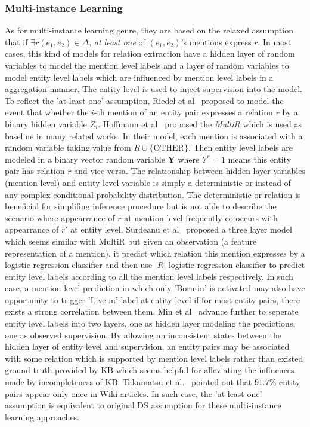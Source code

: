 \documentclass[10pt]{article} %
\theoremstyle{definition}
\theoremstyle{definition}
\begin{document}
\subsubsection{Multi-instance Learning} 
As for multi-instance learning genre, they are based on the relaxed assumption that if $\exists r(e_1, e_2)\in\Delta$, \emph{at least one} of $(e_1, e_2)$'s mentions express $r$. 
In most cases, this kind of models for relation extraction have a hidden layer of random variables to model the mention level labels  
and a layer of random variables to model entity level labels which are influenced by mention level labels in a aggregation manner. 
The entity level is used to inject supervision into the model. 
To reflect the 'at-least-one' assumption, Riedel et al~\cite{riedel} proposed to model the event that whether the $i$-th mention of an entity pair expresses a relation $r$ by a binary hidden variable $Z_i$. 
Hoffmann et al~\cite{hoffmann} proposed the \emph{MultiR} which is used as baseline in many related works. 
In their model, each mention is associated with a random variable taking value from $R\cup\{\text{OTHER}\}$. 
Then entity level labels are modeled in a binary vector random variable $\mathbf{Y}$ where $Y^{r}=1$ means this entity pair has relation $r$ and vice versa. 
The relationship between hidden layer variables (mention level) and entity level variable is simply a deterministic-or instead of any complex conditional probability distribution. 
The deterministic-or relation is beneficial for simplifing inference procedure but is not able to describe the scenario where appearrance of $r$ at mention level frequently co-occurs with appearrance of $r'$ at entity level. 
Surdeanu et al~\cite{surdeanu} proposed a three layer model which seems similar with MultiR but given an observation (a feature representation of a mention), it predict which relation this mention expresses by a logistic regression classifier and then use $\vert R\vert$ logistic regression classifier to predict entity level labels according to all the mention level labels respectively. 
In such case, a mention level prediction in which only 'Born-in' is activated may also have opportunity to trigger 'Live-in' label at entity level if for most entity pairs, there exists a strong correlation between them. 
Min et al~\cite{4layers} advance further to seperate entity level labels into two layers, one as hidden layer modeling the predictions, one as observed supervision. 
By allowing an inconsistent states between the hidden layer of entity level and supervision, an entity pairs may be associated with some relation which is supported by mention level labels rather than existed ground truth provided by KB which seems helpful for alleviating the influences made by incompleteness of KB. 
Takamatsu et al.~\cite{takamatsu} pointed out that $91.7\%$ entity pairs appear only once in Wiki articles. 
In such case, the 'at-least-one' assumption is equivalent to original DS assumption for these multi-instance learning approaches. 
\end{document}
